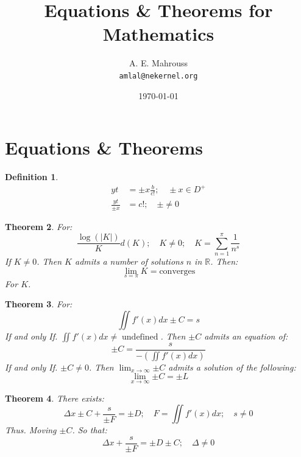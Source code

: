 \documentclass[10pt, twocolumn]{article}
\title{%
  \vspace{-1.5em}%
  \large\textbf{Equations \& Theorems for Mathematics}%
}
\author{A. E. Mahrouss\\\texttt{amlal@nekernel.org}}
\date{\today}
\theoremstyle{plain}
\newtheorem{theorem}{Theorem}[section]
\theoremstyle{definition}
\newtheorem{definition}[theorem]{Definition}
\theoremstyle{remark}
\begin{document}
\twocolumn[{%
  \maketitle
  \vspace{-0.5em}
  \vspace{0.8em}
  \rule{\linewidth}{0.4pt}
  \vspace{1em}
}]

\section{Equations \& Theorems}

\begin{definition}
	\begin{align*}
		yt &= \pm x \frac{b}{c!}; \quad \pm x \in D^{+}\\
		\frac{yt}{\pm x} &= c!; \quad \pm \neq 0
	\end{align*}
\end{definition}

\begin{theorem}
For:
\begin{equation}
    \frac{\log(|K|)}{K} d(K); \quad K \neq 0; \quad K=\sum_{n=1}^{\pi} \frac{1}{n^s}
\end{equation}
If $K \neq 0$. Then $K$ admits a number of solutions $n$ in $\mathbb{R}$. Then:
\begin{equation}
  \lim_{s=\pi} K = \text{converges}
\end{equation}
For $K$.
\end{theorem}

\begin{theorem}
For:
\begin{equation}
  \iint f'(x) dx \pm C = s
\end{equation}
If and only If. $\iint f'(x) dx \neq \operatorname{undefined}$. Then $\pm C$ admits an equation of:
\begin{equation}
  \pm C = \frac{s}{-(\iint f'(x) dx)}
\end{equation}
If and only If. $\pm C \neq 0$. Then $\lim_{x\to \infty}{\pm C}$ admits a solution of the following:
\begin{equation}
  \lim_{x\to \infty}{\pm C} = \pm L
\end{equation}
\end{theorem}

\begin{theorem}
There exists:
\begin{equation}
\Delta x \pm C + \frac{s}{\pm F} = \pm D; \quad F = \iint f'(x) dx; \quad s \neq 0
\end{equation}
Thus. Moving $\pm C$. So that:
\begin{equation}
  \Delta x + \frac{s}{\pm F} = \pm D \pm C ; \quad \Delta \neq 0
\end{equation}
\end{theorem}
\end{document}
